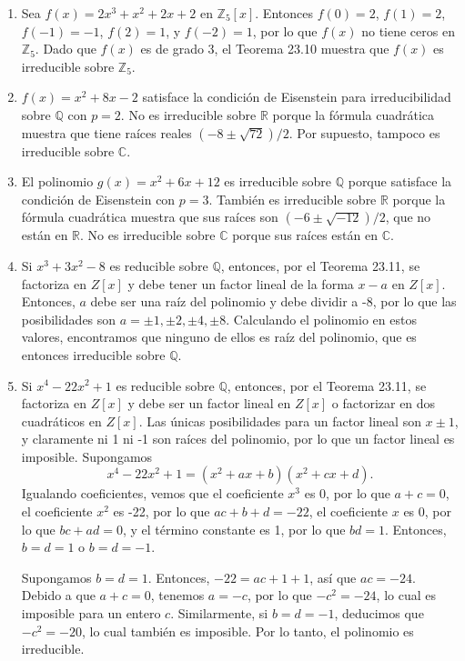 \begin{enumerate}
	\item Sea \(f(x) = 2x^3 + x^2 + 2x + 2\) en \(\mathbb{Z}_5[x]\). Entonces \(f(0) = 2\), \(f(1) = 2\), \(f(-1) = -1\), \(f(2) = 1\), y \(f(-2) = 1\), por lo que \(f(x)\) no tiene ceros en \(\mathbb{Z}_5\). Dado que \(f(x)\) es de grado 3, el Teorema 23.10 muestra que \(f(x)\) es irreducible sobre \(\mathbb{Z}_5\).
		
	\item \(f(x) = x^2 + 8x - 2\) satisface la condición de Eisenstein para irreducibilidad sobre \(\mathbb{Q}\) con \(p = 2\). No es irreducible sobre \(\mathbb{R}\) porque la fórmula cuadrática muestra que tiene raíces reales \((-8 \pm \sqrt{72})/2\). Por supuesto, tampoco es irreducible sobre \(\mathbb{C}\).
		
	\item El polinomio \(g(x) = x^2 + 6x + 12\) es irreducible sobre \(\mathbb{Q}\) porque satisface la condición de Eisenstein con \(p = 3\). También es irreducible sobre \(\mathbb{R}\) porque la fórmula cuadrática muestra que sus raíces son \((-6 \pm \sqrt{-12})/2\), que no están en \(\mathbb{R}\). No es irreducible sobre \(\mathbb{C}\) porque sus raíces están en \(\mathbb{C}\).
		
	\item Si \(x^3 + 3x^2 - 8\) es reducible sobre \(\mathbb{Q}\), entonces, por el Teorema 23.11, se factoriza en \(Z[x]\) y debe tener un factor lineal de la forma \(x - a\) en \(Z[x]\). Entonces, \(a\) debe ser una raíz del polinomio y debe dividir a -8, por lo que las posibilidades son \(a = \pm 1, \pm 2, \pm 4, \pm 8\). Calculando el polinomio en estos valores, encontramos que ninguno de ellos es raíz del polinomio, que es entonces irreducible sobre \(\mathbb{Q}\).
		
	\item Si \(x^4 - 22x^2 + 1\) es reducible sobre \(\mathbb{Q}\), entonces, por el Teorema 23.11, se factoriza en \(Z[x]\) y debe ser un factor lineal en \(Z[x]\) o factorizar en dos cuadráticos en \(Z[x]\). Las únicas posibilidades para un factor lineal son \(x \pm 1\), y claramente ni 1 ni -1 son raíces del polinomio, por lo que un factor lineal es imposible. Supongamos
		\[
		x^4 - 22x^2 + 1 = (x^2 + ax + b)(x^2 + cx + d).
		\]
		Igualando coeficientes, vemos que el coeficiente \(x^3\) es 0, por lo que \(a + c = 0\), el coeficiente \(x^2\) es -22, por lo que \(ac + b + d = -22\), el coeficiente \(x\) es 0, por lo que \(bc + ad = 0\), y el término constante es 1, por lo que \(bd = 1\). Entonces, \(b = d = 1\) o \(b = d = -1\).
		
		Supongamos \(b = d = 1\). Entonces, \(-22 = ac + 1 + 1\), así que \(ac = -24\). Debido a que \(a + c = 0\), tenemos \(a = -c\), por lo que \(-c^2 = -24\), lo cual es imposible para un entero \(c\). Similarmente, si \(b = d = -1\), deducimos que \(-c^2 = -20\), lo cual también es imposible. Por lo tanto, el polinomio es irreducible.
\end{enumerate}
	
